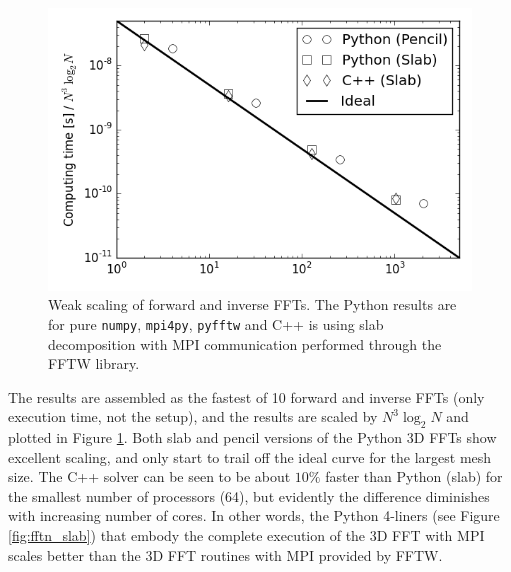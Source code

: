 \documentclass[final,1p,times]{elsarticle}
\newcommand{\inpyth}{\lstinline[style=inlinestyle]} %[]%
\begin{document}


\begin{figure}[ht!]
\centering
\includegraphics[scale=0.48]{weak_scaling_fft_1024.png}
\caption{Weak scaling of forward and inverse FFTs. The Python results are for pure \texttt{numpy}, \texttt{mpi4py}, \texttt{pyfftw} and C++ is using slab decomposition with MPI communication performed through the FFTW library.}
\label{fig:weak_FFT_scaling}
\end{figure}

The results are assembled as the fastest of 10 forward and inverse FFTs (only execution time, not the setup), and the results
are scaled by $N^3 \log_2N$ and plotted in Figure \ref{fig:weak_FFT_scaling}. Both slab and pencil versions of the Python 3D FFTs show excellent scaling,
and only start to trail off the ideal curve for the largest mesh size. The C++ solver can be seen to be about $10 \%$ faster than Python (slab) for the smallest number of processors (64), but evidently the difference diminishes with increasing number of cores. In other words, the Python 4-liners (see Figure \ref{fig:fftn_slab}) that embody the complete execution of the 3D FFT with MPI scales better than the 3D FFT routines with MPI provided by FFTW.  
\end{document}
